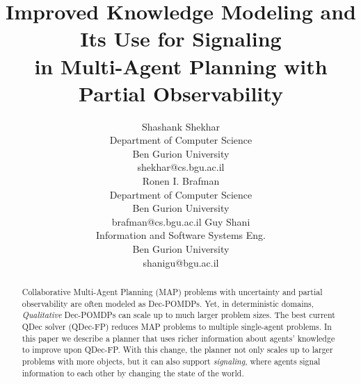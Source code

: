 \documentclass[letterpaper]{article} %
\theoremstyle{definition}
\begin{document}
\title{Improved Knowledge Modeling and Its Use for Signaling\\ in Multi-Agent Planning with Partial Observability}

\author{
    Shashank Shekhar\\
    Department of Computer Science\\
    Ben Gurion University\\
    shekhar@cs.bgu.ac.il\\
    \And
    Ronen I. Brafman\\
    Department of Computer Science\\
    Ben Gurion University\\
    brafman@cs.bgu.ac.il
    \And
    Guy Shani\\
    Information and Software Systems Eng.\\
    Ben Gurion University\\
    shanigu@bgu.ac.il
}

\maketitle

\begin{abstract}
Collaborative Multi-Agent Planning (MAP)
problems with uncertainty and partial observability
are often modeled as Dec-POMDPs. Yet,
in deterministic domains, {\em Qualitative}
Dec-POMDPs can scale up to much larger problem sizes.
The best current QDec solver
(QDec-FP)
reduces MAP problems to multiple single-agent problems.
In this paper we describe a planner that uses richer information about agents' knowledge to improve upon QDec-FP.
With this change, the planner not only scales up to larger problems with more objects, but it can also support
{\em signaling}, where agents signal information to each other by changing the state of the world.
\end{abstract}
\end{document}
